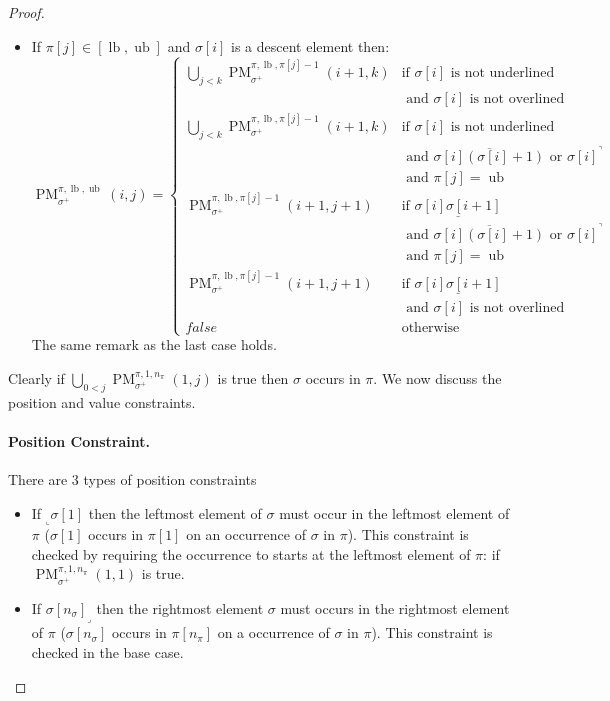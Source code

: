 \documentclass[a4paper]{llncs}
\newcommand{\ptext}{\pi}
\newcommand{\pmotif}{\sigma}
\newcommand{\pbmotif}{\pmotif^+}
\DeclareMathOperator{\PMa}{PM}
\newcommand{\PM}[6]{\PMa_{{#1}}^{{#2},{#3},{#4}}({#5},{#6})}
\DeclareMathOperator{\lb}{lb}
\DeclareMathOperator{\ub}{ub}
\begin{document}
\begin{proof}
\begin{itemize}
	\item If $\ptext[j] \in [\lb,\ub]$ and $\pmotif[i]$ is a descent element then:
	$$
	\PM{\pbmotif}{\ptext}{\lb}{\ub}{i}{j}=
	\begin{cases}
			\bigcup_{j<k} \PM{\pbmotif}{\ptext}{\lb}{\ptext[j]-1}{i+1}{k}
				& \text{if $\pmotif[i]$ is not underlined } \\
				& \text{ and $\pmotif[i]$ is not overlined} \\
			\bigcup_{j<k} \PM{\pbmotif}{\ptext}{\lb}{\ptext[j]-1}{i+1}{k}
				& \text{if $\pmotif[i]$ is not underlined } \\
				& \text{ and $\overline{\pmotif[i](\pmotif[i]+1)}$ or ${\pmotif[i]}^\urcorner$}\\
				& \text{ and $\ptext[j]=\ub$} \\
			\PM{\pbmotif}{\ptext}{\lb}{\ptext[j]-1}{i+1}{j+1}
				& \text{if $\underline{\pmotif[i]\pmotif[i+1]}$ } \\
				& \text{ and $\overline{\pmotif[i](\pmotif[i]+1)}$ or ${\pmotif[i]}^\urcorner$}\\
				& \text{ and $\ptext[j]=\ub$} \\
			\PM{\pbmotif}{\ptext}{\lb}{\ptext[j]-1}{i+1}{j+1}
				& \text{if $\underline{\pmotif[i]\pmotif[i+1]}$ } \\
				& \text{ and $\pmotif[i]$ is not overlined} \\
			false & \text{otherwise}
	\end{cases}
	$$	
	The same remark as the last case holds.

\end{itemize}

Clearly if $\bigcup_{0<j} \PM{\pbmotif}{\ptext}{1}{n_\ptext}{1}{j}$ is true then $\sigma$ occurs in $\pi$. We now discuss the position and value constraints.
\paragraph{Position Constraint.} There are 3 types of position constraints 
\begin{itemize}
	\item If $_\llcorner{\sigma[1]}$ then the leftmost element of $\sigma$  must occur in the leftmost element of $\pi$ ($\pmotif[1]$ occurs in $\ptext[1]$ on an occurrence of $\pmotif$ in $\ptext$). This constraint is checked by requiring the occurrence to starts at the leftmost element of $\ptext$: if  $\PM{\pbmotif}{\ptext}{1}{n_\ptext}{1}{1}$ is true.
	
	\item If ${\pmotif[n_\pmotif]}_\lrcorner$ then the rightmost element $\sigma$ must occurs in the rightmost element of $\pi$ ($\pmotif[n_\pmotif]$ occurs in $\ptext[n_\ptext]$ on a occurrence of $\pmotif$ in $\ptext$). This constraint is checked in the base case.


\end{itemize}
\end{proof}
\end{document}
